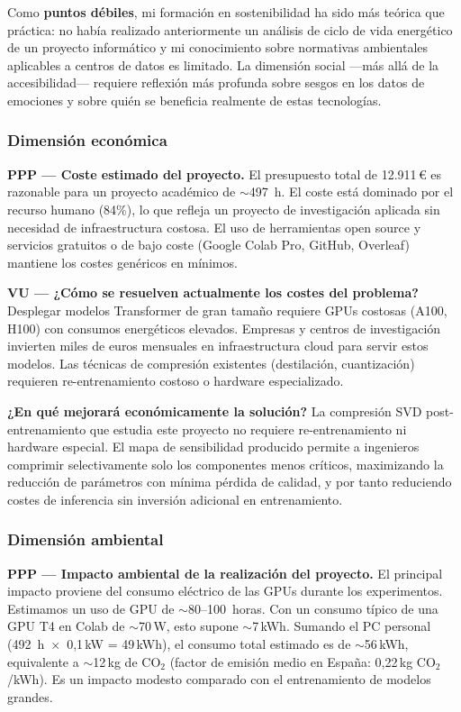 Como \textbf{puntos débiles}, mi formación en sostenibilidad ha sido
más teórica que práctica: no había realizado anteriormente un análisis
de ciclo de vida energético de un proyecto informático y mi
conocimiento sobre normativas ambientales aplicables a centros de datos
es limitado. La dimensión social ---más allá de la accesibilidad---
requiere reflexión más profunda sobre sesgos en los datos de emociones
y sobre quién se beneficia realmente de estas tecnologías.

\subsubsection{Dimensión económica}

\textbf{PPP --- Coste estimado del proyecto.} El presupuesto total de
12.911\,\euro{} es razonable para un proyecto académico de
$\sim$497~h. El coste está dominado por el recurso humano (84\%), lo
que refleja un proyecto de investigación aplicada sin necesidad de
infraestructura costosa. El uso de herramientas open source y servicios
gratuitos o de bajo coste (Google Colab Pro, GitHub, Overleaf) mantiene
los costes genéricos en mínimos.

\textbf{VU --- ¿Cómo se resuelven actualmente los costes del problema?}
Desplegar modelos Transformer de gran tamaño requiere GPUs costosas
(A100, H100) con consumos energéticos elevados. Empresas y centros de
investigación invierten miles de euros mensuales en infraestructura
cloud para servir estos modelos. Las técnicas de compresión existentes
(destilación, cuantización) requieren re-entrenamiento costoso o
hardware especializado.

\textbf{¿En qué mejorará económicamente la solución?} La compresión SVD
post-entrenamiento que estudia este proyecto no requiere
re-entrenamiento ni hardware especial. El mapa de sensibilidad
producido permite a ingenieros comprimir selectivamente solo los
componentes menos críticos, maximizando la reducción de parámetros con
mínima pérdida de calidad, y por tanto reduciendo costes de inferencia
sin inversión adicional en entrenamiento.

\subsubsection{Dimensión ambiental}

\textbf{PPP --- Impacto ambiental de la realización del proyecto.} El
principal impacto proviene del consumo eléctrico de las GPUs durante
los experimentos. Estimamos un uso de GPU de $\sim$80--100~horas. Con
un consumo típico de una GPU T4 en Colab de $\sim$70\,W, esto supone
$\sim$7\,kWh. Sumando el PC personal (492~h~$\times$~0,1\,kW =
49\,kWh), el consumo total estimado es de $\sim$56\,kWh, equivalente a
$\sim$12\,kg de CO$_2$ (factor de emisión medio en España: 0,22\,kg
CO$_2$/kWh). Es un impacto modesto comparado con el entrenamiento de
modelos grandes.

